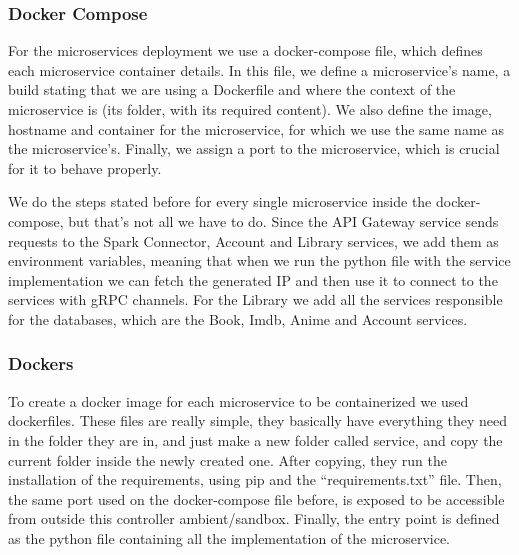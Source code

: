 \documentclass[oneside]{article}
\newcommand*\fpar{\hspace{1ex}}
\begin{document}
    \subsubsection{Docker Compose}
    \fpar For the microservices deployment we use a docker-compose file, which defines each microservice container details. In this file, we define a microservice's name, a build stating that we are using a Dockerfile and where the context of the microservice is (its folder, with its required content). We also define the image, hostname and container for the microservice, for which we use the same name as the microservice's. Finally, we assign a port to the microservice, which is crucial for it to behave properly.
    \par We do the steps stated before for every single microservice inside the docker-compose, but that's not all we have to do. Since the API Gateway service sends requests to the Spark Connector, Account and Library services, we add them as environment variables, meaning that when we run the python file with the service implementation we can fetch the generated IP and then use it to connect to the services with gRPC channels. For the Library we add all the services responsible for the databases, which are the Book, Imdb, Anime and Account services.

    \subsubsection{Dockers}
    \fpar To create a docker image for each microservice to be containerized we used dockerfiles. These files are really simple, they basically have everything they need in the folder they are in, and just make a new folder called service, and copy the current folder inside the newly created one. After copying, they run the installation of the requirements, using pip and the “requirements.txt” file. Then, the same port used on the docker-compose file before, is exposed to be accessible from outside this controller ambient/sandbox. Finally, the entry point is defined as the python file containing all the implementation of the microservice.
\end{document}
